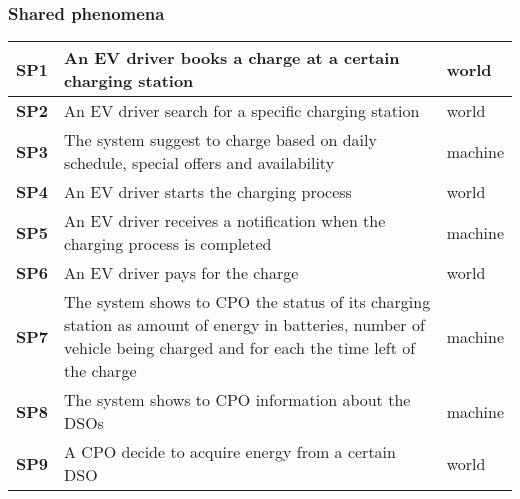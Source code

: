 \subsubsection*{Shared phenomena}
\begin{table}[h]
    \begin{tabular}{|l|l|l|}
        \toprule
        \textbf{SP1}  & An EV driver books a charge at a certain charging station                                                                                                             & world   \\ \midrule
        \textbf{SP2}  & An EV driver search for a specific charging station                                                                                                                   & world   \\ \midrule
        \textbf{SP3}  & The system suggest to charge based on daily schedule, special offers and availability                                                                                 & machine \\ \midrule
        \textbf{SP4}  & An EV driver starts the charging process                                                                                                                              & world   \\ \midrule
        \textbf{SP5}  & An EV driver receives a notification when the charging process is completed                                                                                           & machine \\ \midrule
        \textbf{SP6}  & An EV driver pays for the charge                                                                                                                                      & world   \\ \midrule
        \textbf{SP7}  & The system shows to CPO the status of its charging station as amount of energy in batteries, number of vehicle being charged and for each the time left of the charge & machine \\ \midrule
        \textbf{SP8}  & The system shows to CPO information about the DSOs                                                                                                                    & machine \\ \midrule
        \textbf{SP9}  & A CPO decide to acquire energy from a certain DSO                                                                                                                     & world   \\ \midrule

\end{tabular}
\end{table}
